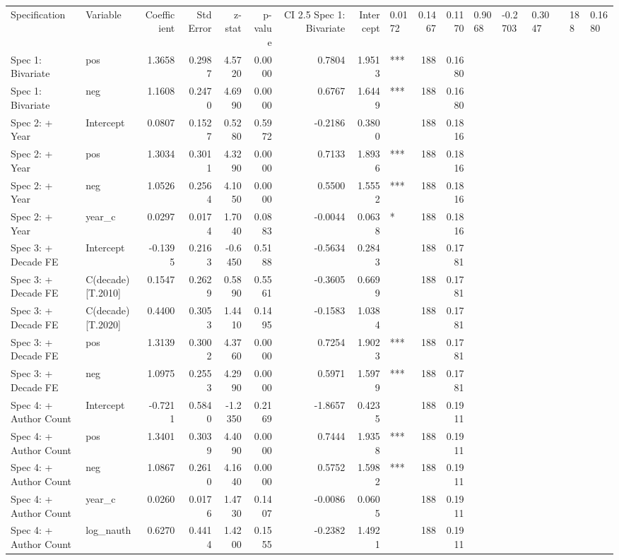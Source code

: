 \begin{tabular}{llrrrrrrlrr}
\toprule
Specification & Variable & Coefficient & Std Error & z-stat & p-value & CI 2.5%
\midrule
Spec 1: Bivariate & Intercept & 0.0172 & 0.1467 & 0.1170 & 0.9068 & -0.2703 & 0.3047 &  & 188 & 0.1680 \\
Spec 1: Bivariate & pos & 1.3658 & 0.2987 & 4.5720 & 0.0000 & 0.7804 & 1.9513 & *** & 188 & 0.1680 \\
Spec 1: Bivariate & neg & 1.1608 & 0.2470 & 4.6990 & 0.0000 & 0.6767 & 1.6449 & *** & 188 & 0.1680 \\
Spec 2: + Year & Intercept & 0.0807 & 0.1527 & 0.5280 & 0.5972 & -0.2186 & 0.3800 &  & 188 & 0.1816 \\
Spec 2: + Year & pos & 1.3034 & 0.3011 & 4.3290 & 0.0000 & 0.7133 & 1.8936 & *** & 188 & 0.1816 \\
Spec 2: + Year & neg & 1.0526 & 0.2564 & 4.1050 & 0.0000 & 0.5500 & 1.5552 & *** & 188 & 0.1816 \\
Spec 2: + Year & year_c & 0.0297 & 0.0174 & 1.7040 & 0.0883 & -0.0044 & 0.0638 & * & 188 & 0.1816 \\
Spec 3: + Decade FE & Intercept & -0.1395 & 0.2163 & -0.6450 & 0.5188 & -0.5634 & 0.2843 &  & 188 & 0.1781 \\
Spec 3: + Decade FE & C(decade)[T.2010] & 0.1547 & 0.2629 & 0.5890 & 0.5561 & -0.3605 & 0.6699 &  & 188 & 0.1781 \\
Spec 3: + Decade FE & C(decade)[T.2020] & 0.4400 & 0.3053 & 1.4410 & 0.1495 & -0.1583 & 1.0384 &  & 188 & 0.1781 \\
Spec 3: + Decade FE & pos & 1.3139 & 0.3002 & 4.3760 & 0.0000 & 0.7254 & 1.9023 & *** & 188 & 0.1781 \\
Spec 3: + Decade FE & neg & 1.0975 & 0.2553 & 4.2990 & 0.0000 & 0.5971 & 1.5979 & *** & 188 & 0.1781 \\
Spec 4: + Author Count & Intercept & -0.7211 & 0.5840 & -1.2350 & 0.2169 & -1.8657 & 0.4235 &  & 188 & 0.1911 \\
Spec 4: + Author Count & pos & 1.3401 & 0.3039 & 4.4090 & 0.0000 & 0.7444 & 1.9358 & *** & 188 & 0.1911 \\
Spec 4: + Author Count & neg & 1.0867 & 0.2610 & 4.1640 & 0.0000 & 0.5752 & 1.5982 & *** & 188 & 0.1911 \\
Spec 4: + Author Count & year_c & 0.0260 & 0.0176 & 1.4730 & 0.1407 & -0.0086 & 0.0605 &  & 188 & 0.1911 \\
Spec 4: + Author Count & log_nauth & 0.6270 & 0.4414 & 1.4200 & 0.1555 & -0.2382 & 1.4921 &  & 188 & 0.1911 \\

\end{tabular}
